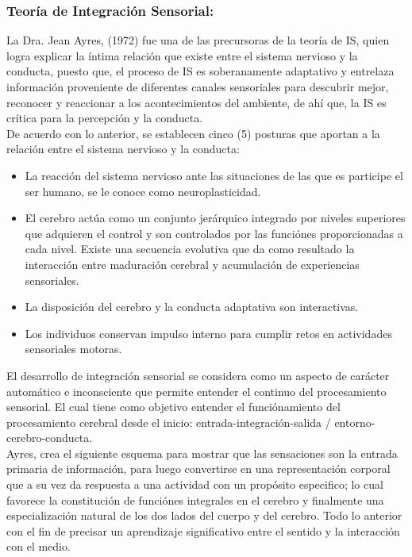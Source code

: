 		\subsubsection{Teoría de Integración Sensorial:}
			La Dra. Jean Ayres, (1972) fue una de las precursoras de la teoría de IS, quien logra explicar la íntima relación que existe entre el sistema nervioso y la conducta, puesto que, el proceso de IS es soberanamente adaptativo y entrelaza información proveniente de diferentes canales sensoriales para descubrir mejor, reconocer y reaccionar a los acontecimientos del ambiente, de ahí que, la IS es crítica para la percepción y la conducta. \\
			De acuerdo con lo anterior, se establecen cinco (5) posturas que aportan a la relación entre el sistema nervioso y la conducta:
			\begin{itemize}
				\item La reacción del sistema nervioso ante las situaciones de las que es participe el ser humano, se le conoce como neuroplasticidad.
				\item El cerebro actúa como un conjunto jerárquico integrado por niveles superiores que adquieren el control y son controlados por las funciónes proporcionadas a cada nivel.
				Existe una secuencia evolutiva que da como resultado la interacción entre maduración cerebral y acumulación de experiencias sensoriales.
				\item La disposición del cerebro y la conducta adaptativa son interactivas.
				\item Los individuos conservan impulso interno para cumplir retos en actividades sensoriales motoras.
			\end{itemize}
			El desarrollo de integración sensorial se considera como un aspecto de carácter automático e inconsciente que permite entender el continuo del procesamiento sensorial. El cual tiene como objetivo entender el funciónamiento del procesamiento cerebral desde el inicio: entrada-integración-salida / entorno-cerebro-conducta. \\
			Ayres, crea el siguiente esquema para mostrar que las sensaciones son la entrada primaria de información, para luego convertirse en una representación corporal que a su vez da respuesta a una actividad con un propósito especifico; lo cual favorece la constitución de funciónes integrales en el cerebro y finalmente una especialización natural de los dos lados del cuerpo y del cerebro. Todo lo anterior con el fin de precisar un aprendizaje significativo entre el sentido y la interacción con el medio.\\
